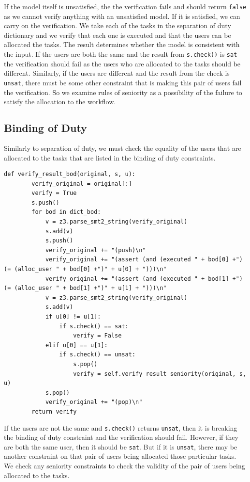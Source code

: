 \documentclass[a4paper]{report}
\begin{document}
If the model itself is unsatisfied, the the verification fails and should return \texttt{false} as we cannot verify anything with an unsatisfied model. If it is satisfied, we can carry on the verification. We take each of the tasks in the separation of duty dictionary and we verify that each one is executed and that the users can be allocated the tasks. The result determines whether the model is consistent with the input. If the users are both the same and the result from \texttt{s.check()} is \texttt{sat} the verification should fail as the users who are allocated to the tasks should be different. Similarly, if the users are different and the result from the check is \texttt{unsat}, there must be some other constraint that is making this pair of users fail the verification. So we examine rules of seniority as a possibility of the failure to satisfy the allocation to the workflow. 

\subsection{Binding of Duty}
Similarly to separation of duty, we must check the equality of the users that are allocated to the tasks that are listed in the binding of duty constraints. 

\begin{lstlisting}[frame=single]
def verify_result_bod(original, s, u):
        verify_original = original[:]
        verify = True
        s.push()
        for bod in dict_bod:
            v = z3.parse_smt2_string(verify_original)
            s.add(v)
            s.push()
            verify_original += "(push)\n"
            verify_original += "(assert (and (executed " + bod[0] +") (= (alloc_user " + bod[0] +")" + u[0] + ")))\n"
            verify_original += "(assert (and (executed " + bod[1] +") (= (alloc_user " + bod[1] +")" + u[1] + ")))\n"
            v = z3.parse_smt2_string(verify_original)
            s.add(v)
            if u[0] != u[1]:
                if s.check() == sat:
                    verify = False
            elif u[0] == u[1]:
                if s.check() == unsat:
                    s.pop()
                    verify = self.verify_result_seniority(original, s, u)
            s.pop()
            verify_original += "(pop)\n"
        return verify
\end{lstlisting}

If the users are not the same and \texttt{s.check()} returns \texttt{unsat}, then it is breaking the binding of duty constraint and the verification should fail. However, if they are both the same user, then it should be \texttt{sat}. But if it is \texttt{unsat}, there may be another constraint on that pair of users being allocated those particular tasks. We check any seniority constraints to check the validity of the pair of users being allocated to the tasks.
\end{document}
